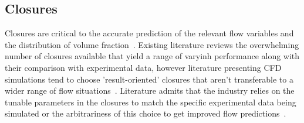 
\subsection{Closures}
Closures are critical to the accurate prediction of the relevant flow variables and the distribution
 of volume fraction~\cite{sugrueRobustMomentumClosure}. Existing literature reviews 
 the overwhelming number of closures available that yield a range of varyinh performance 
 along with their comparison with experimental data, however literature
 presenting CFD simulations tend to choose 'result-oriented' closures that aren't
 transferable to a wider range of flow situations~\cite{krepperValidationClosureModel2018, sugrueAssessmentSimplifiedSet2017}.
 Literature admits that the industry relies on the tunable parameters in the closures to 
 match the specific experimental data being simulated or the arbitrariness of this choice
 to get improved flow predictions~.
 

